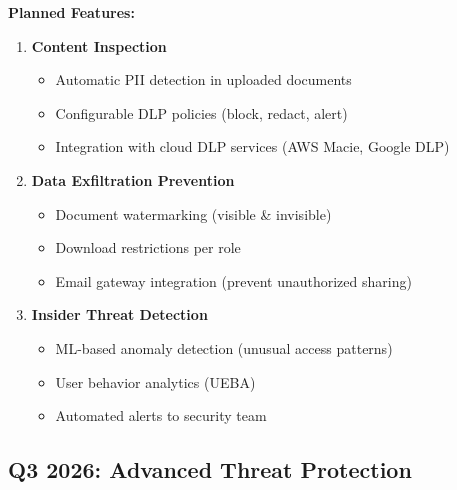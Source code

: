 \textbf{Planned Features:}
\begin{enumerate}
    \item \textbf{Content Inspection}
    \begin{itemize}
        \item Automatic PII detection in uploaded documents
        \item Configurable DLP policies (block, redact, alert)
        \item Integration with cloud DLP services (AWS Macie, Google DLP)
    \end{itemize}
    
    \item \textbf{Data Exfiltration Prevention}
    \begin{itemize}
        \item Document watermarking (visible \& invisible)
        \item Download restrictions per role
        \item Email gateway integration (prevent unauthorized sharing)
    \end{itemize}
    
    \item \textbf{Insider Threat Detection}
    \begin{itemize}
        \item ML-based anomaly detection (unusual access patterns)
        \item User behavior analytics (UEBA)
        \item Automated alerts to security team
    \end{itemize}
\end{enumerate}

\subsection{Q3 2026: Advanced Threat Protection}

